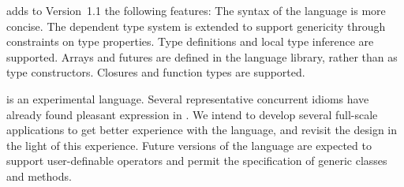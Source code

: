{}\XtenCurrVer{} adds to Version~1.1 the following features:
The syntax of the language is more concise.
The dependent type system is extended to support genericity through
constraints on type properties.  Type definitions and local type inference are
supported.  Arrays and futures are defined in the language library, rather than
as type constructors.  Closures and function types are supported.

{}\Xten{} is an experimental language.  Several representative
concurrent idioms have already found pleasant expression in \Xten. We
intend to develop several full-scale applications to get better
experience with the language, and revisit the design in the light of
this experience. Future versions of the language are expected to
support user-definable operators and permit the specification of
generic classes and methods.

